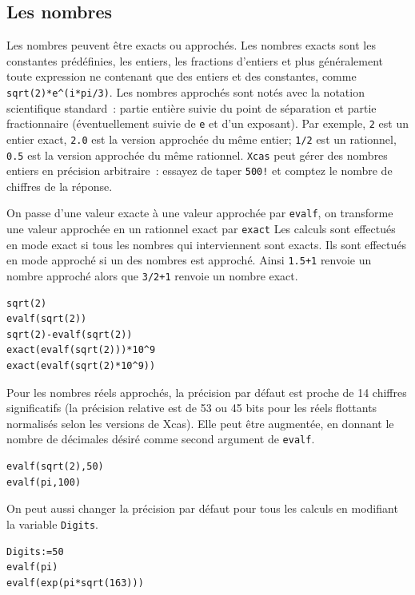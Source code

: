 \documentclass{article}
\begin{document}
\subsection{Les nombres}
%
Les nombres peuvent \^etre exacts ou approch\'es.
Les nombres exacts sont les constantes pr\'ed\'efinies, les entiers, 
les fractions d'entiers et plus g\'en\'eralement toute  expression 
ne contenant que des entiers et des constantes, comme 
\verb|sqrt(2)*e^(i*pi/3)|.
Les nombres approch\'es sont not\'es avec la notation scientifique 
standard~: partie enti\`ere suivie du point de s\'eparation 
et partie fractionnaire (\'eventuellement
suivie de \verb|e| et d'un exposant).
Par exemple, \verb|2| est un entier exact, 
\verb|2.0| est la version approch\'ee du m\^eme
entier; \verb|1/2| est un  rationnel, \verb|0.5| 
est la version approch\'ee du m\^eme
rationnel.
{\tt Xcas} peut g\'erer des nombres entiers en pr\'ecision arbitraire~: 
essayez de taper \verb|500!| et comptez le nombre de chiffres 
de la r\'eponse.

On passe d'une valeur exacte \`a une valeur approch\'ee par
\verb|evalf|, on transforme une valeur approch\'ee en un rationnel
exact par \verb|exact|
Les calculs sont effectu\'es en mode exact si tous les nombres qui
interviennent sont exacts. Ils sont effectu\'es en mode approch\'e si
un des nombres est approch\'e. Ainsi
\verb|1.5+1| renvoie un nombre approch\'e alors que \verb|3/2+1| 
renvoie un nombre exact.
\begin{verbatim}
sqrt(2)
evalf(sqrt(2))
sqrt(2)-evalf(sqrt(2))
exact(evalf(sqrt(2)))*10^9
exact(evalf(sqrt(2)*10^9))
\end{verbatim} 
Pour les nombres r\'eels approch\'es, la pr\'ecision par d\'efaut est
proche de 14 chiffres significatifs (la pr\'ecision relative est de 53
ou 45 bits pour les r\'eels flottants normalis\'es selon les versions de Xcas). 
Elle peut \^etre augment\'ee, en
donnant le nombre de d\'ecimales d\'esir\'e
comme second argument de \verb|evalf|.
\begin{verbatim}
evalf(sqrt(2),50)
evalf(pi,100)
\end{verbatim}
On peut aussi changer la pr\'ecision par d\'efaut pour tous les
calculs en modifiant
la variable \verb|Digits|.
\begin{verbatim}
Digits:=50
evalf(pi)
evalf(exp(pi*sqrt(163)))
\end{verbatim}
\end{document}
